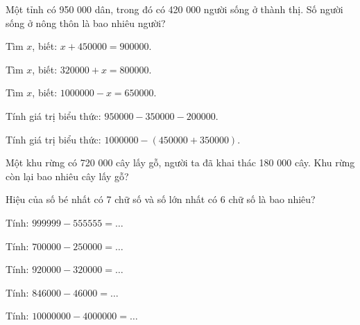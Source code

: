 \begin{ex}
Một tỉnh có 950 000 dân, trong đó có 420 000 người sống ở thành thị. Số người sống ở nông thôn là bao nhiêu người?
\end{ex}

\begin{ex}
Tìm $x$, biết: $x + 450000 = 900000$.
\end{ex}

\begin{ex}
Tìm $x$, biết: $320000 + x = 800000$.
\end{ex}

\begin{ex}
Tìm $x$, biết: $1000000 - x = 650000$.
\end{ex}

\begin{ex}
Tính giá trị biểu thức: $950000 - 350000 - 200000$.
\end{ex}

\begin{ex}
Tính giá trị biểu thức: $1000000 - (450000 + 350000)$.
\end{ex}

\begin{ex}
Một khu rừng có 720 000 cây lấy gỗ, người ta đã khai thác 180 000 cây. Khu rừng còn lại bao nhiêu cây lấy gỗ?
\end{ex}

\begin{ex}
Hiệu của số bé nhất có 7 chữ số và số lớn nhất có 6 chữ số là bao nhiêu?
\end{ex}

\begin{ex}
Tính: $999999 - 555555 = \dots$
\end{ex}

\begin{ex}
Tính: $700000 - 250000 = \dots$
\end{ex}

\begin{ex}
Tính: $920000 - 320000 = \dots$
\end{ex}

\begin{ex}
Tính: $846000 - 46000 = \dots$
\end{ex}

\begin{ex}
Tính: $10000000 - 4000000 = \dots$
\end{ex}
